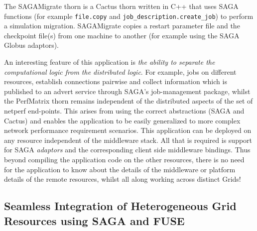 \documentclass[conference,final]{IEEEtran}
\newcommand{\T}{\texttt}
\newcommand{\up}{\vspace*{-0.5em}}
\begin{document}
 The SAGAMigrate thorn is a Cactus thorn
written in C++ that uses SAGA functions (for example \T{file.copy} and
\T{job\_description.create\_job}) to perform a simulation migration.
SAGAMigrate copies a restart parameter file and the checkpoint file(s)
from one machine to another (for example using the SAGA Globus
adaptors).

An interesting feature of this application is {\it the ability to
  separate the computational logic from the distributed logic}. For
example, jobs on different resources, establish connections pairwise
and collect information which is published to an advert service
through SAGA's job-management package, whilst the PerfMatrix thorn
remains independent of the distributed aspects of the set of netperf
end-points.  This arises from using the correct abstractions (SAGA and
Cactus) and enables the application to be easily generalized to more
complex network performance requirement scenarios.  This application
can be deployed on any resource independent of the middleware stack.
All that is required is support for SAGA {\it adaptors} and the
corresponding client side middleware bindings. Thus beyond compiling
the application code on the other resources, there is no need for the
application to know about the details of the middleware or platform
details of the remote resources, whilst all along working across
distinct Grids!

\up
\subsection{Seamless Integration of Heterogeneous Grid Resources 
            using SAGA and FUSE}
\end{document}
